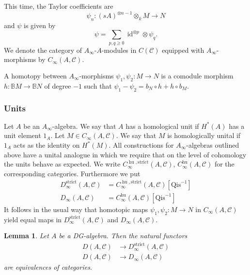 \documentclass{amsart}
\numberwithin{equation}{section}
\let\cal\mathcal
\newtheorem{lemmas}{Lemma}[subsection]
\theoremstyle{definition}
\theoremstyle{remark}
\begin{document}
This time, the Taylor coefficients are
\[
\psi_n:(sA)^{\otimes n-1}\otimes_k M{\rightarrow} N
\]
and $\psi$ is given by 
\[
\psi=\sum_{p,q\geq 0}{\operatorname{id}}^{\otimes p}\otimes \psi_q.
\]
We denote the category of $A_\infty$-$A$-modules in $C({{\cal C}})$ equipped with $A_\infty$-morphisms by
$C_{\infty}(A,{{\cal C}})$. 

A homotopy between $A_\infty$-morphisms $\psi_1,\psi_2:M{\rightarrow} N$ is a comodule morphism
$h:{\mathbb{B}} M{\rightarrow} {\mathbb{B}} N$ of degree $-1$ such that $\psi_1-\psi_2=b_N\circ h+h\circ b_M$. 
\subsubsection{Units}  
 Let $A$ be an $A_\infty$-algebra. We say that $A$ has a
homological unit if $H^\ast(A)$ has a unit element $1_A$.  Let $M\in
C_\infty(A,{{\cal C}})$. We say that $M$ is homologically unital if $1_A$
acts as the identity on $H^\ast(M)$. All constructions for
$A_\infty$-algebras outlined above have a unital analogue in which we require that on the level of cohomology the units behave as expected.
We write $C_\infty^{{\operatorname{hu}},\mathrm{strict}}(A, {{\cal C}})$, $C_{\infty}^{\operatorname{hu}}(A,{{\cal C}})$ for the corresponding
categories.
Furthermore we put
\begin{align*}
D_\infty^{\text{strict}}(A,{{\cal C}})&=C_\infty^{{\operatorname{hu}},\mathrm{strict}}(A,{{\cal C}})[\text{Qis}^{-1}]\\
D_\infty(A,{{\cal C}})&=C_\infty^{\operatorname{hu}}(A,{{\cal C}})[\text{Qis}^{-1}]
\end{align*}
It follows in the usual way that homotopic maps $\psi_1,\psi_2:M{\rightarrow} N$ in $C_\infty(A,{{\cal C}})$ yield equal
maps in $D_\infty^{\text{strict}}(A,{{\cal C}})$ and $D_\infty(A,{{\cal C}})$.
\begin{lemmas} \label{ref-9.2.1-52} Let $A$ be a DG-algebra. Then the natural functors
\begin{align}
D(A,{{\cal C}})&{\rightarrow} D_\infty^{\mathrm{strict}}(A,{{\cal C}})\\
\label{ref-9.3-53}
D(A,{{\cal C}})&{\rightarrow} D_\infty(A,{{\cal C}})
\end{align}
are equivalences of categories.
\end{lemmas}
\end{document}
